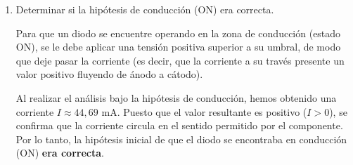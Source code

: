 \documentclass[11pt, a4paper]{article}
\newenvironment{problem}[1][Cuestión]{
		\vspace{0.5cm}
		\noindent{\Large\bfseries #1} \par\vspace{0.5cm}
}{
		\vspace{0.5cm}
}
\begin{document}
\begin{problem}[Cuestión 4]
\begin{enumerate}[label=\alph*)]
{					Donde $(R_1 + R_2)$ se corresponde con la resistencia equivalente de una asociación en serie descrita por la ecuación (14). Despejando la intensidad $I$:
					$$I = \frac{V_1 - V_{D1}}{R_1 + R_2}$$

					Sustituyendo los valores numéricos proporcionados:
					$$I = \frac{15 \text{ V} - 0,7 \text{ V}}{220 \; \Omega + 100 \; \Omega} = \frac{14,3 \text{ V}}{320 \; \Omega} \approx 0,04469 \text{ A}$$

					Expresando el resultado final en miliamperios:
					$$\boxed{I = 44,69 \text{ mA}}$$
				}

			\item Determinar si la hipótesis de conducción (ON) era correcta.

				{ \color{blue} 
					Para que un diodo se encuentre operando en la zona de conducción (estado ON), se le debe aplicar una tensión positiva superior a su umbral, de modo que deje pasar la corriente (es decir, que la corriente a su través presente un valor positivo fluyendo de ánodo a cátodo). 

					Al realizar el análisis bajo la hipótesis de conducción, hemos obtenido una corriente $I \approx 44,69 \text{ mA}$. Puesto que el valor resultante es positivo ($I > 0$), se confirma que la corriente circula en el sentido permitido por el componente. Por lo tanto, la hipótesis inicial de que el diodo se encontraba en conducción (ON) \textbf{era correcta}.
				}
		\end{enumerate}
	\end{problem}
\end{document}
